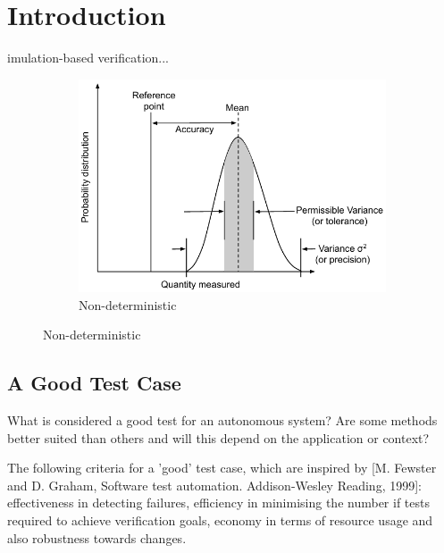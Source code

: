 \documentclass[letterpaper, 10 pt, journal, twoside]{IEEEtran}
\begin{document}
\section{Introduction} \label{s:introduction}

imulation-based verification...

\begin{figure}[!b]
    \centering
    \begin{subfigure}{.48\textwidth}
        \includegraphics[width=1\textwidth]{Figures/Variance_predicition_tolerance_definition_diagram_a.pdf}
        \caption{Non-deterministic}
        \label{variance_description_a}
    \end{subfigure}
\end{figure}



\subsection{A Good Test Case} \label{s:A Good Test Case}

What is considered a good test for an autonomous system? Are some methods better suited than others and will this depend on the application or context?

The following criteria for a ’good’ test case, which are inspired by [M. Fewster and D. Graham, Software test automation. Addison-Wesley Reading, 1999]: effectiveness in detecting failures, efficiency in minimising the number if tests required to achieve verification goals, economy in terms of resource usage and also robustness towards changes. 
\end{document}
